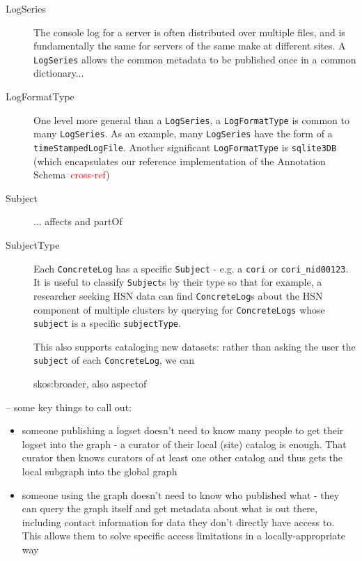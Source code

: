 \begin{description}
\item[LogSeries] \hfill

The console log for a server is often distributed over multiple files,
and is fundamentally the same for servers of the same make at different
sites. A \texttt{LogSeries} allows the common metadata to be published
once in a common dictionary...


\item[LogFormatType]

One level more general than a \texttt{LogSeries}, a \texttt{LogFormatType}
is common to many \texttt{LogSeries}. As an example, many \texttt{LogSeries}
have the form of a \texttt{timeStampedLogFile}. Another significant 
\texttt{LogFormatType} is \texttt{sqlite3DB} (which encapsulates our 
reference implementation of the Annotation Schema~\textcolor{red}{cross-ref})

\item[Subject]
...
affects and partOf



\item[SubjectType]

Each \texttt{ConcreteLog} has a specific \texttt{Subject} - e.g. a 
\texttt{cori} or \texttt{cori\_nid00123}. It is useful to classify 
\texttt{Subject}s by their type so that for example, a researcher 
seeking HSN data can find \texttt{ConcreteLog}s about the HSN 
component of multiple clusters by querying for \texttt{ConcreteLogs}
whose \texttt{subject} is a specific \texttt{subjectType}. 

This also supports cataloging new datasets: rather than asking the
user the \texttt{subject} of each \texttt{ConcreteLog}, we can 

skos:broader, also aspectof


\end{description}

-- some key things to call out:
\begin{itemize}
\item someone publishing a logset doesn't need to know many people to get their 
      logset into the graph - a curator of their local (site) catalog is enough. 
      That curator then knows curators of at least one other catalog and thus 
      gets the local 
      subgraph into the global graph
\item someone using the graph doesn't need to know who published what - they can
      query the graph itself and get metadata about what is out there, including contact 
      information for data they don't directly have access to. This allows them to 
      solve specific access limitations in a locally-appropriate way
\end{itemize}

